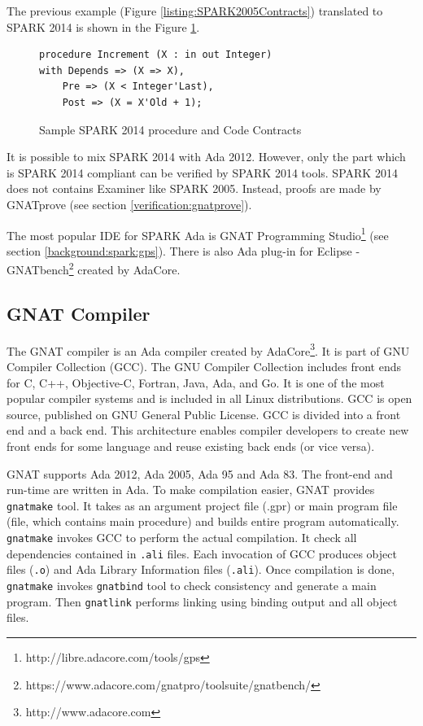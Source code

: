 The previous example (Figure \ref{listing:SPARK2005Contracts}) translated to SPARK 2014 is shown in the Figure \ref{listing:SPARK2014Contracts}.

\begin{figure}
\singlespacing
\begin{lstlisting}[language=ada2012, frame=single, gobble=0]
procedure Increment (X : in out Integer)
with Depends => (X => X),
	Pre => (X < Integer'Last),
	Post => (X = X'Old + 1);
\end{lstlisting}
\doublespacing
\caption{Sample SPARK 2014 procedure and Code Contracts}
\label{listing:SPARK2014Contracts}
\end{figure}

It is possible to mix SPARK 2014 with Ada 2012. However, only the part which is SPARK 2014 compliant can be verified by SPARK 2014 tools. SPARK 2014 does not contains Examiner like SPARK 2005. Instead, proofs are made by GNATprove (see section \ref{verification:gnatprove}).

The most popular IDE for SPARK Ada is GNAT Programming Studio\footnote{http://libre.adacore.com/tools/gps} (see section \ref{background:spark:gps}). There is also Ada plug-in for Eclipse - GNATbench\footnote{https://www.adacore.com/gnatpro/toolsuite/gnatbench/} created by AdaCore. 



\subsection{GNAT Compiler}
\label{background:spark:gnat}

The GNAT compiler is an Ada compiler created by AdaCore\footnote{http://www.adacore.com}. It is part of GNU Compiler Collection (GCC). The GNU Compiler Collection includes front ends for C, C++, Objective-C, Fortran, Java, Ada, and Go. It is one of the most popular compiler systems and is included in all Linux distributions. GCC is open source, published on GNU General Public License. GCC is divided into a front end and a back end. This architecture enables compiler developers to create new front ends for some language and reuse existing back ends (or vice versa).

GNAT supports Ada 2012, Ada 2005, Ada 95 and Ada 83. The front-end and run-time are written in Ada. To make compilation easier, GNAT provides \lstinline{gnatmake} tool. It takes as an argument project file (.gpr) or main program file (file, which contains main procedure) and builds entire program automatically. \lstinline{gnatmake} invokes GCC to perform the actual compilation. It check all dependencies contained in \lstinline{.ali} files. Each invocation of GCC produces object files (\lstinline{.o}) and Ada Library Information files (\lstinline{.ali}). Once compilation is done, \lstinline{gnatmake} invokes \lstinline{gnatbind} tool to check consistency and generate a main program. Then \lstinline{gnatlink} performs linking using binding output and all object files.

